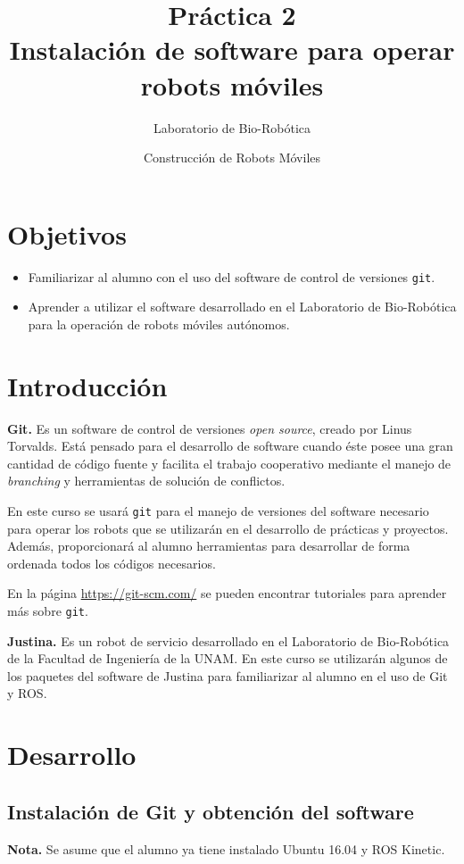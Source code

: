 \documentclass[a4paper,12pt]{article}
\title{Práctica 2 \\ Instalación de software para operar robots móviles}
\author{Laboratorio de Bio-Robótica}
\date{Construcción de Robots Móviles}
\begin{document}
\renewcommand{\tablename}{Tabla}
\maketitle
\section*{Objetivos}
\begin{itemize}
\item Familiarizar al alumno con el uso del software de control de versiones \texttt{git}.
\item Aprender a utilizar el software desarrollado en el Laboratorio de Bio-Robótica para la operación de robots móviles autónomos. 
\end{itemize}

\section{Introducción}
\textbf{Git.} Es un software de control de versiones \textit{open source}, creado por Linus Torvalds. Está pensado para el desarrollo de software cuando éste posee una gran cantidad de código fuente y facilita el trabajo cooperativo mediante el manejo de \textit{branching} y herramientas de solución de conflictos. 

En este curso se usará \texttt{git} para el manejo de versiones del software necesario para operar los robots que se utilizarán en el desarrollo de prácticas y proyectos. Además, proporcionará al alumno herramientas para desarrollar de forma ordenada todos los códigos necesarios.

En la página \url{https://git-scm.com/} se pueden encontrar tutoriales para aprender más sobre \texttt{git}.

\textbf{Justina.} Es un robot de servicio desarrollado en el Laboratorio de Bio-Robótica de la Facultad de Ingeniería de la UNAM. En este curso se utilizarán algunos de los paquetes del software de Justina para familiarizar al alumno en el uso de Git y ROS. 

\section{Desarrollo}
\subsection{Instalación de Git y obtención del software}
\textbf{Nota.} Se asume que el alumno ya tiene instalado Ubuntu 16.04 y ROS Kinetic. 
\end{document}
